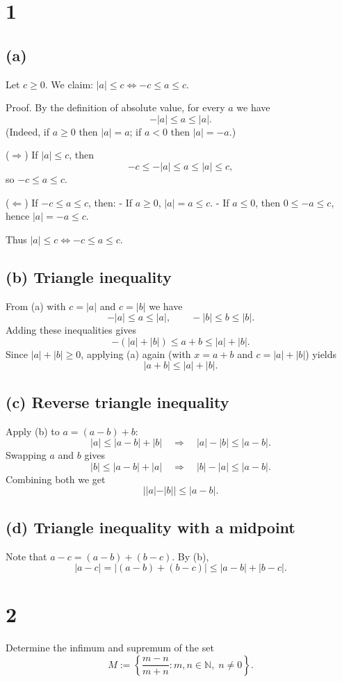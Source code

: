 \documentclass[12pt,a4paper]{article}
\theoremstyle{definition}
\theoremstyle{remark}
\begin{document}
\section*{1}
\subsection*{(a)}
Let $c \ge 0$. We claim: $|a| \le c \iff -c \le a \le c$.

Proof. By the definition of absolute value, for every $a$ we have
\[
-|a| \le a \le |a|.
\]
(Indeed, if $a \ge 0$ then $|a|=a$; if $a<0$ then $|a|=-a$.)

($\Rightarrow$) If $|a| \le c$, then
\[
-c \le -|a| \le a \le |a| \le c,
\]
so $-c \le a \le c$.

($\Leftarrow$) If $-c \le a \le c$, then:
- If $a \ge 0$, $|a|=a \le c$.
- If $a \le 0$, then $0 \le -a \le c$, hence $|a|=-a \le c$.

Thus $|a| \le c \iff -c \le a \le c$.

\subsection*{(b) Triangle inequality}
From (a) with $c=|a|$ and $c=|b|$ we have
\[
-|a|\le a\le |a|,\qquad -|b|\le b\le |b|.
\]
Adding these inequalities gives
\[
-(|a|+|b|)\le a+b\le |a|+|b|.
\]
Since $|a|+|b|\ge0$, applying (a) again (with $x=a+b$ and $c=|a|+|b|$) yields
\[
|a+b|\le |a|+|b|.
\]

\subsection*{(c) Reverse triangle inequality}
Apply (b) to $a=(a-b)+b$:
\[
|a|\le |a-b|+|b|\quad\Rightarrow\quad |a|-|b|\le |a-b|.
\]
Swapping $a$ and $b$ gives
\[
|b|\le |a-b|+|a|\quad\Rightarrow\quad |b|-|a|\le |a-b|.
\]
Combining both we get
\[
||a|-|b||\le |a-b|.
\]

\subsection*{(d) Triangle inequality with a midpoint}
Note that $a-c=(a-b)+(b-c)$. By (b),
\[
|a-c|=|(a-b)+(b-c)|\le |a-b|+|b-c|.
\]





\section*{2}
Determine the infimum and supremum of the set
\[
M := \left\{ \frac{m-n}{m+n} : m,n\in \mathbb{N},\; n\ne 0 \right\}.
\]
\end{document}
